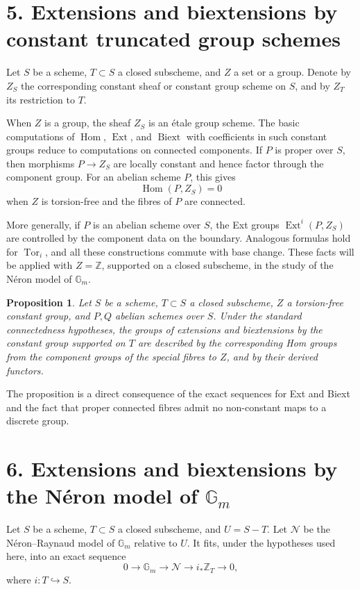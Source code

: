 \documentclass[11pt]{article}
\theoremstyle{plain}
\newtheorem{proposition}[theorem]{Proposition}
\theoremstyle{definition}
\theoremstyle{remark}
\newcommand{\bZ}{\mathbb Z}
\DeclareMathOperator{\Hom}{Hom}
\DeclareMathOperator{\Ext}{Ext}
\DeclareMathOperator{\Tor}{Tor}
\DeclareMathOperator{\Biext}{Biext}
\newcommand{\Gm}{\mathbb G_m}
\begin{document}
\section*{5. Extensions and biextensions by constant truncated group schemes}

Let \(S\) be a scheme, \(T\subset S\) a closed subscheme, and \(Z\) a set or a
group. Denote by \(Z_S\) the corresponding constant sheaf or constant group
scheme on \(S\), and by \(Z_T\) its restriction to \(T\).

When \(Z\) is a group, the sheaf \(Z_S\) is an étale group scheme. The basic
computations of \(\Hom\), \(\Ext\), and \(\Biext\) with coefficients in such
constant groups reduce to computations on connected components. If \(P\) is
proper over \(S\), then morphisms \(P\to Z_S\) are locally constant and hence
factor through the component group. For an abelian scheme \(P\), this gives
\[
\Hom(P,Z_S)=0
\]
when \(Z\) is torsion-free and the fibres of \(P\) are connected.

More generally, if \(P\) is an abelian scheme over \(S\), the Ext groups
\(\Ext^i(P,Z_S)\) are controlled by the component data on the boundary. Analogous
formulas hold for \(\Tor_i\), and all these constructions commute with base
change. These facts will be applied with \(Z=\bZ\), supported on a closed
subscheme, in the study of the Néron model of \(\Gm\).

\begin{proposition}
Let \(S\) be a scheme, \(T\subset S\) a closed subscheme, \(Z\) a torsion-free
constant group, and \(P,Q\) abelian schemes over \(S\). Under the standard
connectedness hypotheses, the groups of extensions and biextensions by the
constant group supported on \(T\) are described by the corresponding Hom groups
from the component groups of the special fibres to \(Z\), and by their derived
functors.
\end{proposition}

The proposition is a direct consequence of the exact sequences for Ext and Biext
and the fact that proper connected fibres admit no non-constant maps to a
discrete group.

\section*{6. Extensions and biextensions by the Néron model of \(\Gm\)}

Let \(S\) be a scheme, \(T\subset S\) a closed subscheme, and \(U=S-T\). Let
\(\mathcal N\) be the Néron--Raynaud model of \(\Gm\) relative to \(U\). It fits,
under the hypotheses used here, into an exact sequence
\[
0\longrightarrow \Gm\longrightarrow \mathcal N\longrightarrow
i_*\bZ_T\longrightarrow 0,
\]
where \(i:T\hookrightarrow S\).
\end{document}

